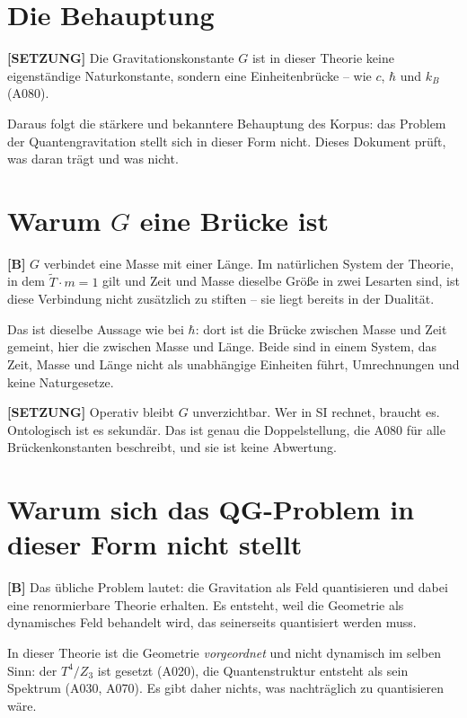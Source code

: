 \section{Die Behauptung}

\textbf{[SETZUNG]} Die Gravitationskonstante $G$ ist in dieser Theorie keine
eigenständige Naturkonstante, sondern eine Einheitenbrücke -- wie $c$,
$\hbar$ und $k_B$ (A080).

Daraus folgt die stärkere und bekanntere Behauptung des Korpus: das Problem der
Quantengravitation stellt sich in dieser Form nicht. Dieses Dokument prüft,
was daran trägt und was nicht.

\section{Warum $G$ eine Brücke ist}

\textbf{[B]} $G$ verbindet eine Masse mit einer Länge. Im natürlichen System
der Theorie, in dem $\tilde T\cdot m = 1$ gilt und Zeit und Masse dieselbe
Größe in zwei Lesarten sind, ist diese Verbindung nicht zusätzlich zu
stiften -- sie liegt bereits in der Dualität.

Das ist dieselbe Aussage wie bei $\hbar$: dort ist die Brücke zwischen Masse
und Zeit gemeint, hier die zwischen Masse und Länge. Beide sind in einem System,
das Zeit, Masse und Länge nicht als unabhängige Einheiten führt, Umrechnungen
und keine Naturgesetze.

\textbf{[SETZUNG]} Operativ bleibt $G$ unverzichtbar. Wer in SI rechnet,
braucht es. Ontologisch ist es sekundär. Das ist genau die Doppelstellung, die
A080 für alle Brückenkonstanten beschreibt, und sie ist keine Abwertung.

\section{Warum sich das QG-Problem in dieser Form nicht stellt}

\textbf{[B]} Das übliche Problem lautet: die Gravitation als Feld quantisieren
und dabei eine renormierbare Theorie erhalten. Es entsteht, weil die Geometrie
als dynamisches Feld behandelt wird, das seinerseits quantisiert werden muss.

In dieser Theorie ist die Geometrie \emph{vorgeordnet} und nicht dynamisch im
selben Sinn: der $T^4/Z_3$ ist gesetzt (A020), die Quantenstruktur entsteht
als sein Spektrum (A030, A070). Es gibt daher nichts, was nachträglich zu
quantisieren wäre.

